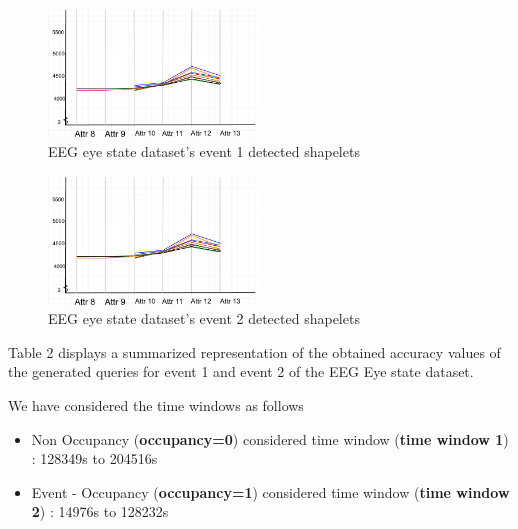 \documentclass[letterpaper, 10 pt, conference]{IEEEtran}  %
\begin{document}
\begin{figure}[h!]
\includegraphics[width=0.5\textwidth]{EEG_event1.png}
\caption{EEG eye state dataset's event 1 detected shapelets}
\end{figure}

\begin{figure}[h!]
\includegraphics[width=0.5\textwidth]{EEG_event1.png}
\caption{EEG eye state dataset's event 2 detected shapelets}
\end{figure}

Table 2 displays a summarized representation of the obtained accuracy values of the generated queries for event 1 and event 2 of the EEG Eye state dataset.

We have considered the time windows as follows
\begin{itemize}
\item Non Occupancy (\textbf{occupancy=0}) considered time window (\textbf{time window 1}) : 128349s to 204516s
\item Event - Occupancy (\textbf{occupancy=1}) considered time window (\textbf{time window 2}) : 14976s to 128232s
\end{itemize}
\end{document}
